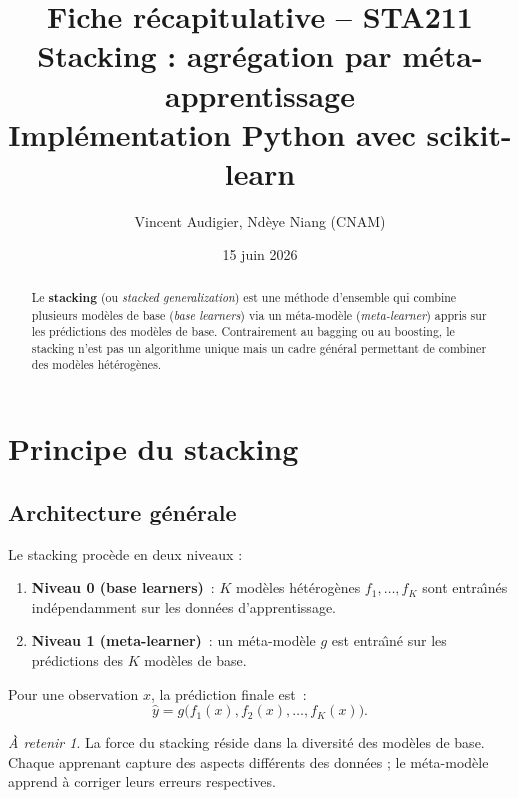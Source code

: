 \documentclass[a4paper,11pt]{article}
\title{\textbf{Fiche r\'ecapitulative -- STA211}\\[4pt]
\large Stacking : agr\'egation par m\'eta-apprentissage \\[2pt]
\small Impl\'ementation Python avec scikit-learn}
\author{Vincent Audigier, Nd\`eye Niang (CNAM)}
\date{15 juin 2026}
\theoremstyle{definition}
\theoremstyle{remark}
\newtheorem*{important}{\`A retenir}
\begin{document}
\maketitle
\thispagestyle{empty}

\begin{abstract}
Le \textbf{stacking} (ou \textit{stacked generalization}) est une
m\'ethode d'ensemble qui combine plusieurs mod\`eles de base
(\textit{base learners}) via un m\'eta-mod\`ele (\textit{meta-learner})
appris sur les pr\'edictions des mod\`eles de base. Contrairement au
bagging ou au boosting, le stacking n'est pas un algorithme unique mais
un cadre g\'en\'eral permettant de combiner des mod\`eles
h\'et\'erog\`enes.
\end{abstract}

\vfill
\tableofcontents
\newpage

\section{Principe du stacking}

\subsection{Architecture g\'en\'erale}

Le stacking proc\`ede en deux niveaux :

\begin{enumerate}
  \item \textbf{Niveau 0 (base learners)}~: $K$ mod\`eles
    h\'et\'erog\`enes $f_1,\dots,f_K$ sont entra\^\i n\'es
    ind\'ependamment sur les donn\'ees d'apprentissage.
  \item \textbf{Niveau 1 (meta-learner)}~: un m\'eta-mod\`ele $g$ est
    entra\^\i n\'e sur les pr\'edictions des $K$ mod\`eles de base.
\end{enumerate}

Pour une observation $x$, la pr\'ediction finale est~:
\[
\hat y = g\bigl(f_1(x), f_2(x), \dots, f_K(x)\bigr).
\]

\begin{important}
La force du stacking r\'eside dans la diversit\'e des mod\`eles de base.
Chaque apprenant capture des aspects diff\'erents des donn\'ees ; le
m\'eta-mod\`ele apprend \`a corriger leurs erreurs respectives.
\end{important}
\end{document}
